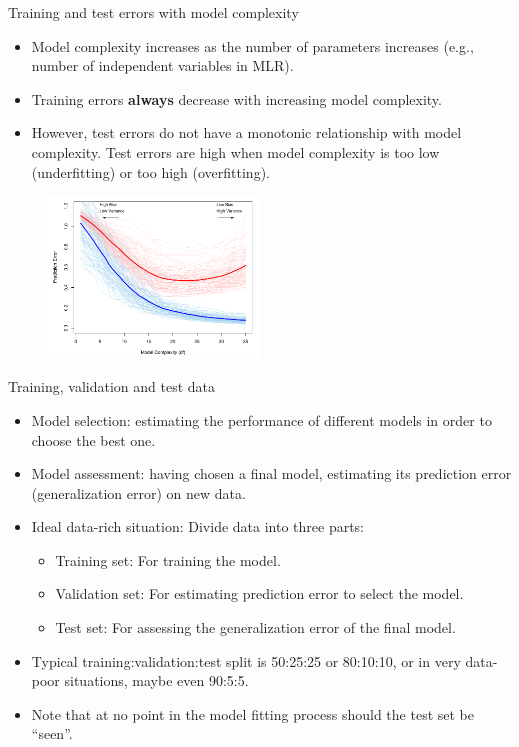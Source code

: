 \documentclass{beamer}
\begin{document}
\begin{frame}{Training and test errors with model complexity}
    \begin{itemize}
        \item Model complexity increases as the number of parameters increases (e.g., number of independent variables in MLR). 
        \item Training errors \textbf{always} decrease with increasing model complexity.
        \item However, test errors do not have a monotonic relationship with model complexity. Test errors are high when model complexity is too low (underfitting) or too high (overfitting).
    \end{itemize}
    \begin{figure}
        \centering
        \includegraphics[width=0.5\textwidth]{figures/fig7-1.pdf}
    \end{figure}
\end{frame}


\begin{frame}{Training, validation and test data}
    \begin{itemize}
        \item Model selection: estimating the performance of different models in order to choose the best one.
        \item Model assessment: having chosen a final model, estimating its prediction error (generalization error) on new data.
        \item Ideal data-rich situation: Divide data into three parts:
        \begin{itemize}
            \item Training set: For training the model.
            \item Validation set: For estimating prediction error to select the model.
            \item Test set: For assessing the generalization error of the final model.
        \end{itemize}
        \item Typical training:validation:test split is 50:25:25 or 80:10:10, or in very data-poor situations, maybe even 90:5:5.
        \item Note that at no point in the model fitting process should the test set be ``seen''.
    \end{itemize}
\end{frame}
\end{document}
